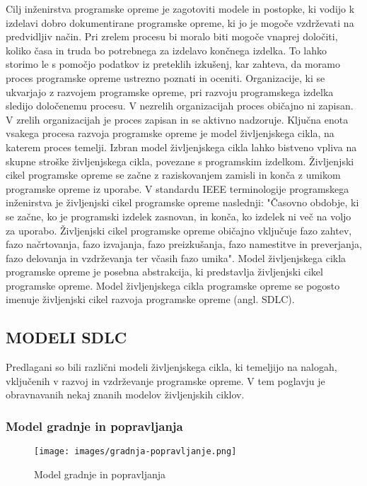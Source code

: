 \documentclass[a4paper,12pt,openright]{book}
\begin{document}
Cilj inženirstva programske opreme je zagotoviti modele in postopke, ki vodijo k izdelavi dobro dokumentirane programske opreme, ki jo je mogoče vzdrževati na predvidljiv način. Pri zrelem procesu bi moralo biti mogoče vnaprej določiti, koliko časa in truda bo potrebnega za izdelavo končnega izdelka. To lahko storimo le s pomočjo podatkov iz preteklih izkušenj, kar zahteva, da moramo proces programske opreme ustrezno poznati in oceniti.
Organizacije, ki se ukvarjajo z razvojem programske opreme, pri razvoju programskega izdelka sledijo določenemu procesu. V nezrelih organizacijah proces običajno ni zapisan. V zrelih organizacijah je proces zapisan in se aktivno nadzoruje. Ključna enota vsakega procesa razvoja programske opreme je model življenjskega cikla, na katerem proces temelji. Izbran model življenjskega cikla lahko bistveno vpliva na skupne stroške življenjskega cikla, povezane s programskim izdelkom. Življenjski cikel programske opreme se začne z raziskovanjem zamisli in konča z umikom programske opreme iz uporabe.
V standardu IEEE terminologije programskega inženirstva je življenjski cikel programske opreme naslednji:
"Časovno obdobje, ki se začne, ko je programski izdelek zasnovan, in konča, ko izdelek ni več na voljo za uporabo. Življenjski cikel programske opreme običajno vključuje fazo zahtev, fazo načrtovanja, fazo izvajanja, fazo preizkušanja, fazo namestitve in preverjanja, fazo delovanja in vzdrževanja ter včasih fazo umika".
Model življenjskega cikla programske opreme je posebna abstrakcija, ki predstavlja življenjski cikel programske opreme. Model življenjskega cikla programske opreme se pogosto imenuje življenjski cikel razvoja programske opreme (angl. SDLC). \cite{aggarwal2005software}
\subsection{MODELI SDLC}

Predlagani so bili različni modeli življenjskega cikla, ki temeljijo na nalogah, vključenih v razvoj in vzdrževanje programske opreme. V tem poglavju je obravnavanih nekaj znanih modelov življenjskih ciklov.
\subsubsection{Model gradnje in popravljanja}
\begin{figure}[H]
    \centering
    \texttt{[image: images/gradnja-popravljanje.png]}
    \caption{Model gradnje in popravljanja}
    \label{fig:gradnja}
\end{figure}
\end{document}
